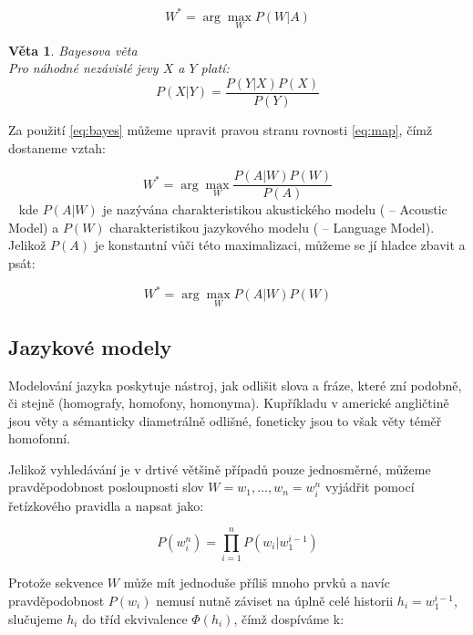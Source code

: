 \begin{equation}
	\label{eq:map}
	W^* = \arg \max_{W} P(W|A)
\end{equation}

\newtheorem{t:bayes}{Věta}
\begin{t:bayes}
Bayesova věta \\
Pro náhodné nezávislé jevy $X$ a $Y$ platí:
\begin{equation}
	\label{eq:bayes}
	P(X|Y) = \frac{P(Y|X) P(X)}{P(Y)}
\end{equation}
\end{t:bayes}

Za použití \ref{eq:bayes} můžeme upravit pravou stranu rovnosti \ref{eq:map}, čímž dostaneme vztah:

\begin{equation}
	\label{eq:map2}
	W^* = \arg \max_{W} \frac{P(A|W) P(W)}{P(A)}
\end{equation}\
%
kde $P(A|W)$ je nazývána charakteristikou akustického modelu ( -- Acoustic Model) a $P(W)$ charakteristikou jazykového modelu ( -- Language Model). Jelikož $P(A)$ je konstantní vůči této maximalizaci, můžeme se jí hladce zbavit a psát:

\begin{equation}
	\label{eq:map3}
	W^* = \arg \max_{W} P(A|W) P(W)
\end{equation}

\subsection{Jazykové modely}

Modelování jazyka poskytuje nástroj, jak odlišit slova a fráze, které zní podobně, či stejně (homografy, homofony, homonyma). Kupříkladu v americké angličtině jsou věty  a  sémanticky diametrálně odlišné, foneticky jsou to však věty téměř homofonní. 

Jelikož vyhledávání je v drtivé většině případů pouze jednosměrné, můžeme pravděpodobnost posloupnosti slov $W = w_1, \dots, w_n = w^n_i$ vyjádřit pomocí řetízkového pravidla a napsat jako:

\begin{equation}
	\label{eq:lm}
	P(w^n_i) = \prod\limits_{i=1}^n P(w_i|w^{i-1}_1)
\end{equation}

Protože sekvence $W$ může mít jednoduše příliš mnoho prvků a navíc pravděpodobnost $P(w_i)$ nemusí nutně záviset na úplně celé historii $h_i = w_1^{i-1}$, slučujeme $h_i$ do tříd ekvivalence $\Phi (h_i)$, čímž dospíváme k:

